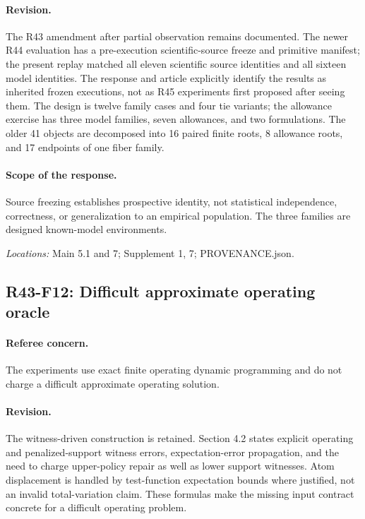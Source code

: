 \paragraph*{Revision.} The R43 amendment after partial observation remains documented. The newer R44 evaluation has a pre-execution scientific-source freeze and primitive manifest; the present replay matched all eleven scientific source identities and all sixteen model identities. The response and article explicitly identify the results as inherited frozen executions, not as R45 experiments first proposed after seeing them. The design is twelve family cases and four tie variants; the allowance exercise has three model families, seven allowances, and two formulations. The older 41 objects are decomposed into 16 paired finite roots, 8 allowance roots, and 17 endpoints of one fiber family.

\paragraph*{Scope of the response.} Source freezing establishes prospective identity, not statistical independence, correctness, or generalization to an empirical population. The three families are designed known-model environments.

\noindent\textit{Locations:} Main 5.1 and 7; Supplement 1, 7; PROVENANCE.json.

\subsection{R43-F12: Difficult approximate operating oracle}
\paragraph*{Referee concern.} The experiments use exact finite operating dynamic programming and do not charge a difficult approximate operating solution.

\paragraph*{Revision.} The witness-driven construction is retained. Section 4.2 states explicit operating and penalized-support witness errors, expectation-error propagation, and the need to charge upper-policy repair as well as lower support witnesses. Atom displacement is handled by test-function expectation bounds where justified, not an invalid total-variation claim. These formulas make the missing input contract concrete for a difficult operating problem.

